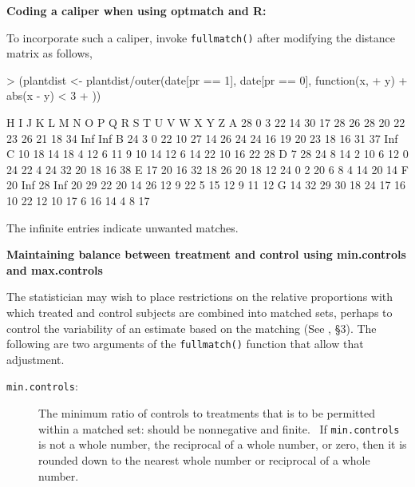\documentclass[12pt,twoside]{article}
\begin{document}
{{\bigskip

{\ttfamily
\textrm{\textbf{Coding a caliper when using optmatch and R:}}}


\bigskip

{ \textrm{
To incorporate such a caliper, invoke \texttt{fullmatch()} after modifying the
distance matrix as follows,}}


\bigskip

\begin{Schunk}
\begin{Sinput}
> (plantdist <- plantdist/outer(date[pr == 1], date[pr == 0], function(x, 
+     y) {
+     abs(x - y) < 3
+ }))
\end{Sinput}
\begin{Soutput}
   H   I  J   K  L  M  N  O  P  Q  R  S  T  U  V  W  X   Y   Z
A 28   0  3  22 14 30 17 28 26 28 20 22 23 26 21 18 34 Inf Inf
B 24   3  0  22 10 27 14 26 24 24 16 19 20 23 18 16 31  37 Inf
C 10  18 14  18  4 12  6 11  9 10 14 12  6 14 22 10 16  22  28
D  7  28 24   8 14  2 10  6 12  0 24 22  4 24 32 20 18  16  38
E 17  20 16  32 18 26 20 18 12 24  0  2 20  6  8  4 14  20  14
F 20 Inf 28 Inf 20 29 22 20 14 26 12  9 22  5 15 12  9  11  12
G 14  32 29  30 18 24 17 16 10 22 12 10 17  6 16 14  4   8  17
\end{Soutput}
\end{Schunk}

{\ttfamily
\textrm{The infinite entries indicate unwanted matches.}}

\bigskip

{\rmfamily\bfseries
Maintaining balance between treatment and control using min.controls and
max.controls}


\bigskip

{
 \textrm{The statistician may wish to place restrictions on the relative
proportions with which treated and control subjects are combined into
matched sets, perhaps to control the variability of an estimate based
on the matching (See \citealt{Hansen:2004}, {\S}3). The following are two
arguments of the }\texttt{fullmatch()} \textrm{function that allow that
adjustment.}}


\bigskip

\begin{description}
\item[\texttt{min.controls}:] The minimum ratio of controls to
treatments that is to be permitted within a matched set: should
be nonnegative and finite. \ If \texttt{min.controls} is not a
whole number, the reciprocal of a whole number, or zero, then it
is rounded down to the nearest whole number or reciprocal of a
whole number.


\end{description}}}
\end{document}
